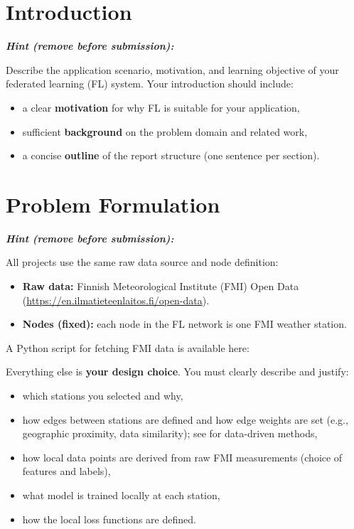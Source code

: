 \documentclass{article}
\newenvironment{hint}{%
	\par\medskip\noindent
	\begin{minipage}[t]{\dimexpr\columnwidth-8mm}%
	\raggedright\itshape
	\textbf{Hint (remove before submission):}\space
}{%
	\end{minipage}\par\medskip
}
\begin{document}
\section{Introduction}

\begin{hint}
	Describe the application scenario, motivation, and learning objective of your
	federated learning (FL) system.
	Your introduction should include:
	\begin{itemize}
		\item a clear \textbf{motivation} for why FL is suitable for your application,
		\item sufficient \textbf{background} on the problem domain and related work,
		\item a concise \textbf{outline} of the report structure (one sentence per section).
	\end{itemize}
\end{hint}


\section{Problem Formulation}
\label{sec:pf}
\begin{hint}
	All projects use the same raw data source and node definition:
	\begin{itemize}
		\item \textbf{Raw data:} Finnish Meteorological Institute (FMI) Open Data
		(\url{https://en.ilmatieteenlaitos.fi/open-data}).
		\item \textbf{Nodes (fixed):} each node in the FL network is one FMI weather station.
	\end{itemize}
	A Python script for fetching FMI data is available here:

	\medskip
	Everything else is \textbf{your design choice}. You must clearly
	describe and justify:
	\begin{itemize}
		\item which stations you selected and why,
		\item how edges between stations are defined and how edge weights are set
		(e.g., geographic proximity, data similarity);
		see \cite[Ch.~7]{Jung2025} for data-driven methods,
		\item how local data points are derived from raw FMI measurements
		(choice of features and labels),
		\item what model is trained locally at each station,
		\item how the local loss functions are defined.
	\end{itemize}
\end{hint}
\end{document}

